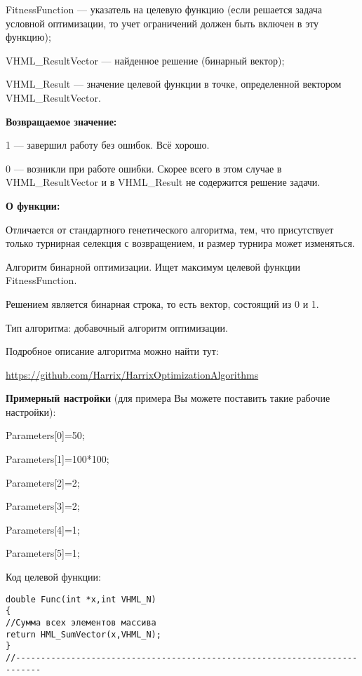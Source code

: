 FitnessFunction --- указатель на целевую функцию (если решается задача условной оптимизации, то учет ограничений должен быть включен в эту функцию);
 
VHML\_ResultVector --- найденное решение (бинарный вектор);
 
VHML\_Result --- значение целевой функции в точке, определенной вектором VHML\_ResultVector.

\textbf{Возвращаемое значение:} 

 1 --- завершил работу без ошибок. Всё хорошо.
 
 0 --- возникли при работе ошибки. Скорее всего в этом случае в VHML\_ResultVector и в VHML\_Result не содержится решение задачи.

 
\textbf{О функции:}

Отличается от стандартного генетического алгоритма, тем, что присутствует только турнирная селекция с возвращением, и размер турнира может изменяться.

Алгоритм бинарной оптимизации. Ищет максимум целевой функции FitnessFunction.

Решением является бинарная строка, то есть вектор, состоящий из 0 и 1.

Тип алгоритма: добавочный алгоритм оптимизации.

Подробное описание алгоритма можно найти тут:

\href{https://github.com/Harrix/HarrixOptimizationAlgorithms/blob/master/\_HarrixOptimizationAlgorithms.pdf}{https://github.com/Harrix/HarrixOptimizationAlgorithms}

\textbf{Примерный настройки} (для примера Вы можете поставить такие рабочие настройки):

 Parameters[0]=50;
 
Parameters[1]=100*100;

Parameters[2]=2;

Parameters[3]=2;

Parameters[4]=1;

Parameters[5]=1;

Код целевой функции:
\begin{lstlisting}[caption=Оптимизируемая функция]
double Func(int *x,int VHML_N)
{
//Сумма всех элементов массива
return HML_SumVector(x,VHML_N);
}
//---------------------------------------------------------------------------
\end{lstlisting}